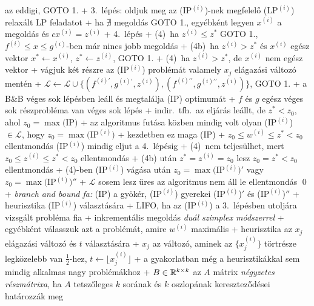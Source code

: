     az eddigi, GOTO 1.
  + 3.~lépés: oldjuk meg az (IP$^{(i)}$)-nek megfelelő (LP$^{(i)}$)
    relaxált LP feladatot
    + ha $\nexists$ megoldás \RA GOTO 1., egyébként legyen
      $x^{(i)}$ a megoldás és $c x^{(i)} = z^{(i)}$
  + 4.~lépés
    + (4\phantom{b})~ha $z^{(i)} \le z^*$ \RA GOTO 1.,
      $f^{(i)} \le x \le g^{(i)}$-ben már nincs jobb megoldás
    + (4b)~ha $z^{(i)} > z^*$ és $x^{(i)}$ egész vektor \RA $x^* \gets
      x^{(i)}$, $z^* \gets z^{(i)}$, GOTO 1.
    + (4\phantom{b})~ha $z^{(i)} > z^*$, de $x^{(i)}$ nem
      egész vektor
     + vágjuk két részre az (IP$^{(i)}$) problémát valamely $x_j$
       elágazási változó mentén
     + $\mathcal{L} \gets \mathcal{L} \cup \{(f^{(i)\prime},
       g^{(i)\prime}, z^{(i)}), (f^{(i)\prime\prime},
       g^{(i)\prime\prime}, z^{(i)})\}$, GOTO 1.
  + \thm a B\&B véges sok lépésben leáll és megtalálja (IP) optimumát
    + \proof $f$ és $g$ egész \RA véges sok részprobléma van \RA véges
      sok lépés
    + indir.~tfh.~az eljárás leállt, de $z^* < z_0$, ahol $z_0 = \max
      \text{(IP)}$
    + az algoritmus futása közben mindig volt olyan (IP$^{(i)}$) $\in
      \mathcal{L}$, hogy $z_0 = \max \text{(IP$^{(i)}$)}$
      + kezdetben ez maga (IP)
      + $z_0 \le w^{(i)} \le z^* < z_0$ ellentmondás \RA (IP$^{(i)}$)
        mindig eljut a 4.~lépésig
      + (4\phantom{b})~nem teljesülhet, mert $z_0 \le z^{(i)}
        \le z^* < z_0$ ellentmondás
      + (4b) után $z^* = z^{(i)} = z_0$ lesz \RA $z_0 = z^* < z_0$
        ellentmondás
      + (4\phantom{b})-ben (IP$^{(i)}$) vágása után $z_0 = \max
        \text{(IP$^{(i)}$)}{}'$ vagy $z_0 = \max \text{(IP$^{(i)}$)}{}''$
    + $\mathcal{L}$ sosem lesz üres \RA az algoritmus nem áll le \RA
      ellentmondás \qed
  + \emph{branch and bound fa:} (IP) a gyökér, (IP$^{(i)}$) gyerekei
    (IP$^{(i)}$)$'$ és (IP$^{(i)}$)$''$
  + heurisztika (IP$^{(i)}$) választására
    + LIFO, ha az (IP$^{(i)}$) a 3.~lépésben utoljára vizsgált probléma fia
      + inkrementális megoldás \emph{duál szimplex módszerrel}
    + egyébként válasszuk azt a problémát, amire $w^{(i)}$ maximális
  + heurisztika az $x_j$ elágazási változó és $t$ választására
    + $x_j$ az változó, aminek az $\bigl\{ x^{(i)}_j \bigr\}$ törtrésze
      legközelebb van $\frac{1}{2}$-hez, $t \gets \bigl\lfloor
      x^{(i)}_j \bigr\rfloor$
  + a gyakorlatban még a heurisztikákkal sem mindig alkalmas nagy
    problémákhoz
+ \dfn $B \in \mathbb{R}^{k \times k}$ az $A$ mátrix \emph{négyzetes
  részmátrixa}, ha $A$ tetszőleges $k$ sorának és $k$ oszlopának
  kereszteződései határozzák meg
